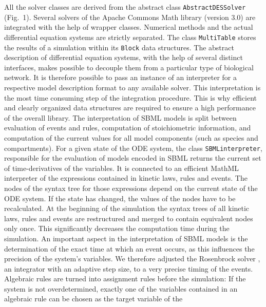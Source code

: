 \documentclass[10pt]{bmc_article}
\newenvironment{bmcformat}{\baselineskip20pt\sloppy\setboolean{publ}{false}}{\baselineskip20pt\sloppy}
\newcommand{\AbstractDESSolver}{\texttt{Abstract\-DES\-Solver}}
\newcommand{\SBMLinterpreter}{\texttt{SBML\-interpreter}}
\newcommand{\MultiTable}{\texttt{Multi\-Table}}
\newcommand{\Block}{\texttt{Block}}
\begin{document}
\begin{bmcformat}
All the solver classes are derived from the abstract class \AbstractDESSolver{}
(Fig.~1).
Several solvers of the Apache Commons Math library (version 3.0) are integrated
with the help of wrapper classes. Numerical methods and the actual differential
equation systems are strictly separated. The class \MultiTable{} stores the
results of a simulation within its \Block{} data structures. 
%
The abstract description of differential equation systems, with the help of
several distinct interfaces, makes possible to decouple them from a particular
type of biological network. It is therefore possible to pass an instance of an
interpreter for a respective model description format to any available solver.
%
This interpretation is the most time consuming step of the integration procedure.
This is why efficient and clearly organized data structures are required to
ensure a high performance of the overall library. The interpretation of SBML
models is split between evaluation of events and rules, computation of
stoichiometric information, and computation of the current values for all model
components (such as species and compartments).
%
For a given state of the ODE system, the class \SBMLinterpreter, responsible
for the evaluation of models encoded in SBML returns the current set of
time-derivatives of the variables.
It is connected to an efficient MathML interpreter of the expressions contained
in kinetic laws, rules and events. The nodes of the syntax tree for those
expressions depend on the current state of the ODE system. If the state has
changed, the values of the nodes have to be recalculated.
At the beginning of the simulation the syntax trees of all kinetic laws, rules
and events are restructured and merged to contain equivalent nodes only once.
This significantly decreases the computation time during the simulation.
%
An important aspect in the interpretation of SBML models is the
determination of the exact time at which an event occurs, as this influences
the precision of the system's variables. We therefore adjusted the Rosenbrock
solver \cite{Kotcon2011}, an integrator with an adaptive step size, to a very
precise timing of the events.
%
Algebraic rules are turned into assignment rules before the
simulation: If the system is not overdetermined, exactly one of the variables
contained in an algebraic rule can be chosen as the target variable of the

\end{bmcformat}
\end{document}
